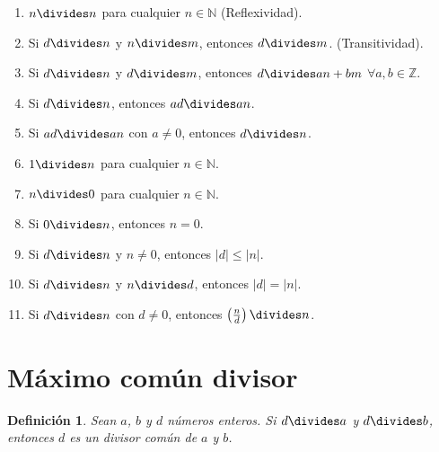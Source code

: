\documentclass[oneside,a5paper]{memoir}
\newtheorem{definition}{Definición}[chapter] %
\begin{document}
\begin{enumerate}[font={\bfseries},label={\arabic*)}]
\item\label{prop:1} $n\divides n$ para cualquier $n\in\mathbb{N}$ (Reflexividad).
\item\label{prop:2} Si $d\divides n$ y $n\divides m$, entonces $d\divides m$. (Transitividad).
\item\label{prop:3} Si $d\divides n$ y $d\divides m$, entonces $d\divides an+bm$ $\forall a,b\in\mathbb{Z}$.
\item\label{prop:4} Si $d\divides n$, entonces $ad\divides an$.
\item\label{prop:5} Si $ad\divides an$ con $a\neq0$, entonces $d\divides n$.
\item\label{prop:6} $1\divides n$ para cualquier $n\in\mathbb{N}$.
\item\label{prop:7} $n\divides 0$ para cualquier $n\in\mathbb{N}$.
\item\label{prop:8} Si $0\divides n$, entonces $n=0$.
\item\label{prop:9} Si $d\divides n$ y $n\neq0$, entonces $|d|\leq|n|$.
\item\label{prop:10} Si $d\divides n$ y $n\divides d$, entonces $|d|=|n|$.
\item\label{prop:11} Si $d\divides n$ con $d\neq0$, entonces $\left(\frac{n}{d}\right)\divides n$.
\end{enumerate}

\section{Máximo común divisor}

\begin{definition}\label{def:1.2}
Sean $a$, $b$ y $d$ números enteros. Si $d\divides a$ y $d\divides b$, entonces $d$ es un divisor común de $a$ y $b$.
\end{definition}
\end{document}
